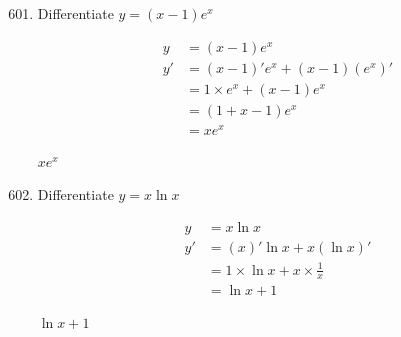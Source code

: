 \setcounter{exercise}{500}
\begin{enumerate}[resume] 
    \setcounter{enumi}{600}
    \item \begin{exercise} Differentiate $y=(x-1)e^{x}$ \\
        \begin{envSolution}
		   \begin{align*} 
               y  & = (x-1)e^{x}                \\[0.5cm]
               y' & = (x-1)'e^{x}+(x-1)(e^{x})'	\\
			      & = 1 \times e^{x}+(x-1)e^{x} \\
				  & = (1+x-1)e^x                \\
				  & = xe^x
           \end{align*}		
                \begin{shortsolution}
  	                $xe^x$
                \end{shortsolution}
        \end{envSolution}%
    \end{exercise}

    \item \begin{exercise} Differentiate $y=x\ln x$ \\
        \begin{envSolution}
		   \begin{align*} 
               y  & = x \ln x                              \\[0.5cm]  
               y' & = (x)'\ln x + x(\ln x)'                \\
			      & = 1 \times \ln x +x \times \frac{1}{x} \\
				  & = \ln x +1
           \end{align*}		
                \begin{shortsolution}
  	                $\ln x +1$
                \end{shortsolution}
        \end{envSolution}%
    \end{exercise}

\end{enumerate}



